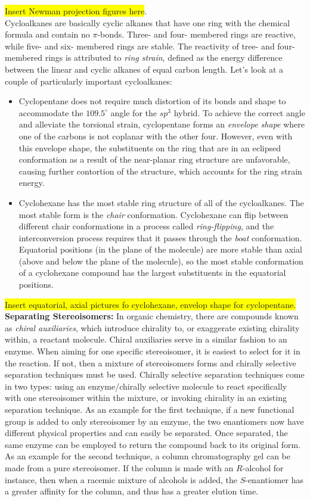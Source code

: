 \documentclass{article}
\theoremstyle{plain}%
\theoremstyle{definition}
\theoremstyle{remark}
\newcommand{\hilight}[1]{\colorbox{yellow}{#1}}
\begin{document}
\hilight{Insert Newman projection figures here}. \\
Cycloalkanes are basically cyclic alkanes that have one ring with the chemical formula  and contain no $\pi$-bonds. Three- and four- membered rings are reactive, while five- and six- membered rings are stable. The reactivity of tree- and four- membered rings is attributed to \textit{ring strain}, defined as the energy difference between the linear and cyclic alkanes of equal carbon length. Let's look at a couple of particularly important cycloalkanes:
\begin{itemize}
	\item Cyclopentane does not require much distortion of its bonds and shape to accommodate the $109.5^{\circ}$ angle for the $sp^3$ hybrid. To achieve the correct angle and alleviate the torsional strain, cyclopentane forms an \textit{envelope shape} where one of the carbons is not coplanar with the other four. However, even with this envelope shape, the substituents on the ring that are in an eclipsed conformation as a result of the near-planar ring structure are unfavorable, causing further contortion of the structure, which accounts for the ring strain energy. 
	\item Cyclohexane has the most stable ring structure of all of the cycloalkanes. The most stable form is the \textit{chair} conformation. Cyclohexane can flip between different chair conformations in a process called \textit{ring-flipping}, and the interconversion process requires that it passes through the \textit{boat} conformation. Equatorial positions (in the plane of the molecule) are more stable than axial (above and below the plane of the molecule), so the most stable conformation of a cyclohexane compound has the largest substituents in the equatorial positions.
\end{itemize}
\hilight{Insert equatorial, axial pictures fo cyclohexane, envelop shape for cyclopentane.}\\
\indent \textbf{Separating Stereoisomers:} In organic chemistry, there are compounds known as \textit{chiral auxiliaries}, which introduce chirality to, or exaggerate existing chirality within, a reactant molecule. Chiral auxiliaries serve in a similar fashion to an enzyme. When aiming for one specific stereoisomer, it is easiest to select for it in the reaction. If not, then a mixture of stereoisomers forms and chirally selective separation techniques must be used. Chirally selective separation techniques come in two types: using an enzyme/chirally selective molecule to react specifically with one stereoisomer within the mixture, or invoking chirality in an existing separation technique. As an example for the first technique, if a new functional group is added to only stereoisomer by an enzyme, the two enantiomers now have different physical properties and can easily be separated. Once separated, the same enzyme can be employed to return the compound back to its original form. As an example for the second technique, a column chromatography gel can be made from a pure stereoisomer. If the column is made with an $R$-alcohol for instance, then when a racemic mixture of alcohols is added, the $S$-enantiomer has a greater affinity for the column, and thus has a greater elution time.
\end{document}
